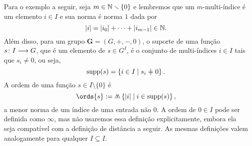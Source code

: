 Para o exemplo a seguir, seja $m \in \mathbb{N} \smallsetminus \{0\}$ e lembremos que um $m$-multi-índice é um elemento $i \in I$ e sua norma é norma $1$ dada por
	\begin{equation*}
	\left\vert{i}\right\vert = \left\vert{i_0}\right\vert + \cdots + \left\vert{i_{m-1}}\right\vert \in \mathbb{N}.
	\end{equation*}
Além disso, para um grupo $\bm G = (G,+,-,0)$, o suporte de uma função ${s}\colon {I} \longrightarrow {G}$, que é um elemento de $s \in G^{I}$, é o conjunto de multi-índices $i \in I$ tais que $s_i \neq 0$, ou seja,
	\begin{equation*}
	\supp(s) = \set{i \in I}{s_i \neq 0}.
	\end{equation*}
A ordem de uma função $s \in I \setminus \{0\}$ é
	\begin{equation*}
	\ords{s} := \min\set{\abs{i}}{i \in \supp(s)},
	\end{equation*}
a menor norma de um índice de uma entrada não $0$. A ordem de $0 \in I$ pode ser definida como $\infty$, mas não usaremos essa definição explicitamente, embora ela seja compatível com a definição de distância a seguir. As mesmas definições valem analogamente para qualquer $I \subseteq I$.


